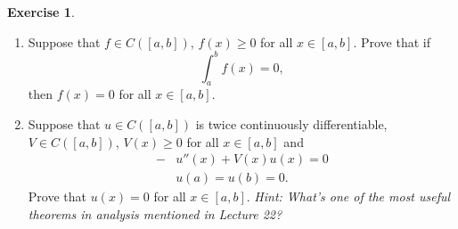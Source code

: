 \documentclass[12pt]{article}
\theoremstyle{definition}
\newtheorem{exercise}{Exercise}
\begin{document}
\thispagestyle{firstpage}

\begin{exercise}
    \hfill
    \begin{enumerate}[label=(\alph*)]
        \item Suppose that \(f \in C([a, b])\), \(f (x) \geq 0\) for all \(x \in [a, b]\). Prove that if
        \[
            \int_{a}^{b} f(x) = 0,
        \]
        then \(f(x) = 0\) for all \(x \in [a, b]\).
        \item Suppose that \(u \in C([a, b])\) is twice continuously differentiable, \(V \in C([a, b])\), \(V(x) \geq 0\) for all \(x \in [a, b]\) and
        \begin{align*}
            -&u''(x) + V(x)u(x) = 0 \\
            &u(a) = u(b) = 0.
        \end{align*}
        Prove that \(u(x) = 0\) for all \(x \in [a, b]\). \textit{Hint: What’s one of the most useful theorems in analysis mentioned in Lecture 22?}
    \end{enumerate}
\end{exercise}
\end{document}
